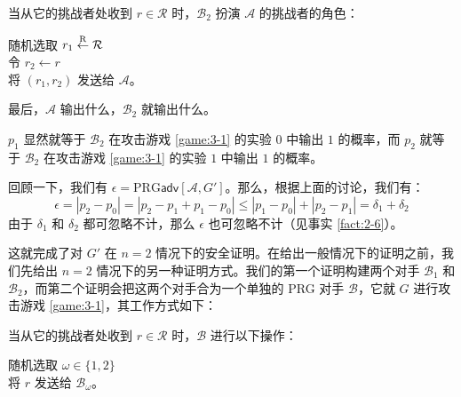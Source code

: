 \vspace*{10pt}

\hspace*{5pt} 当从它的挑战者处收到 $r\in\mathcal R$ 时，$\mathcal B_2$ 扮演 $\mathcal A$ 的挑战者的角色：

\vspace*{5pt}

\hspace*{28.5pt} 随机选取 $r_1\overset{\rm R}\leftarrow\mathcal R$\\
\hspace*{50pt} 令 $r_2\leftarrow r$\\
\hspace*{50pt} 将 $(r_1,r_2)$ 发送给 $\mathcal A$。

\vspace*{5pt}

\hspace*{5pt} 最后，$\mathcal A$ 输出什么，$\mathcal B_2$ 就输出什么。

\vspace*{10pt}

\noindent
$p_1$ 显然就等于 $\mathcal B_2$ 在攻击游戏 \ref{game:3-1} 的实验 $0$ 中输出 $1$ 的概率，而 $p_2$ 就等于 $\mathcal B_2$ 在攻击游戏 \ref{game:3-1} 的实验 $1$ 中输出 $1$ 的概率。

回顾一下，我们有 $\epsilon=\mathrm{PRG}\mathsf{adv}[\mathcal{A},G']$。那么，根据上面的讨论，我们有：
\[
\epsilon
=|p_2-p_0|
=|p_2-p_1+p_1-p_0|
\leq|p_1-p_0|+|p_2-p_1|
=\delta_1+\delta_2
\]
由于 $\delta_1$ 和 $\delta_2$ 都可忽略不计，那么 $\epsilon$ 也可忽略不计（见事实 \ref{fact:2-6}）。

这就完成了对 $G'$ 在 $n=2$ 情况下的安全证明。在给出一般情况下的证明之前，我们先给出 $n=2$ 情况下的另一种证明方式。我们的第一个证明构建两个对手 $\mathcal B_1$ 和 $\mathcal B_2$，而第二个证明会把这两个对手合为一个单独的 PRG 对手 $\mathcal B$，它就 $G$ 进行攻击游戏 \ref{game:3-1}，其工作方式如下：

\vspace*{10pt}

\hspace*{5pt} 当从它的挑战者处收到 $r\in\mathcal R$ 时，$\mathcal B$ 进行以下操作：

\vspace*{5pt}

\hspace*{28.5pt} 随机选取 $\omega\in\{1,2\}$\\
\hspace*{50pt} 将 $r$ 发送给 $\mathcal B_\omega$。

